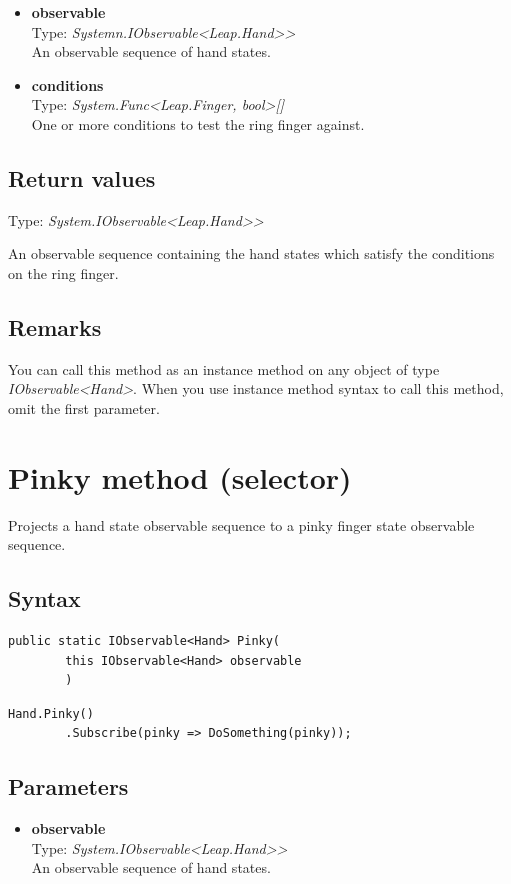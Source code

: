 \documentclass[12pt,a4paper,twoside]{report}
\begin{document}
\begin{itemize}
    \item \textbf{observable}\\
        Type: \textit{Systemn.IObservable<Leap.Hand>{}>}\\
        An observable sequence of hand states.
    \item \textbf{conditions}\\
        Type: \textit{System.Func<Leap.Finger, bool>[]}\\
        One or more conditions to test the ring finger against.
\end{itemize}

\subsection{Return values}
Type: \textit{System.IObservable<Leap.Hand>{}>}

An observable sequence containing the hand states which satisfy the conditions on the ring finger.

\subsection{Remarks}
You can call this method as an instance method on any object of type \textit{IObservable<Hand>}. When you use 
instance method syntax to call this method, omit the first parameter.

\section{Pinky method (selector)}
Projects a hand state observable sequence to a pinky finger state observable sequence.

\subsection{Syntax}
\begin{lstlisting}[caption=Declaration]
    public static IObservable<Hand> Pinky(
        this IObservable<Hand> observable
        )
\end{lstlisting}

\begin{lstlisting}[caption=Usage example]
    Hand.Pinky()
        .Subscribe(pinky => DoSomething(pinky));
\end{lstlisting}

\subsection{Parameters}
\begin{itemize}
    \item \textbf{observable}\\
    Type: \textit{System.IObservable<Leap.Hand>{}>}\\
    An observable sequence of hand states.
\end{itemize}
\end{document}
